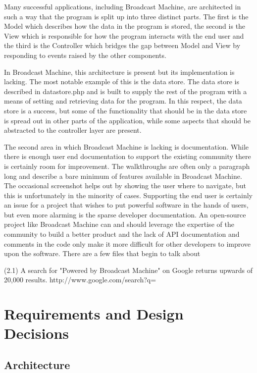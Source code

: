 \documentclass[a4paper,12pt]{report}
\begin{document}
	Many successful applications, including Broadcast Machine, are architected in such a way that the program is split up into three distinct parts. The first is the Model which describes how the data in the program is stored, the second is the View which is responsible for how the program interacts with the end user and the third is the Controller which bridges the gap between Model and View by responding to events raised by the other components.
	
	In Broadcast Machine, this architecture is present but its implementation is lacking. The most notable example of this is the data store. The data store is described in datastore.php and is built to supply the rest of the program with a means of setting and retrieving data for the program. In this respect, the data store is a success, but some of the functionality that should be in the data store is spread out in other parts of the application, while some aspects that should be abstracted to the controller layer are present.
	
	The second area in which Broadcast Machine is lacking is documentation. While there is enough user end documentation to support the existing community there is certainly room for improvement. The walkthroughs are often only a paragraph long and describe a bare minimum of features available in Broadcast Machine. The occasional screenshot helps out by showing the user where to navigate, but this is unfortunately in the minority of cases. Supporting the end user is certainly an issue for a project that wishes to put powerful software in the hands of users, but even more alarming is the sparse developer documentation. An open-source project like Broadcast Machine can and should leverage the expertise of the community to build a better product and the lack of API documentation and comments in the code only make it more difficult for other developers to improve upon the software. There are a few files that begin to talk about 
	
(2.1) A search for "Powered by Broadcast Machine" on Google returns upwards of 20,000 results.
http://www.google.com/search?q=%

\chapter{Requirements and Design Decisions}

\section{Architecture}
\end{document}
